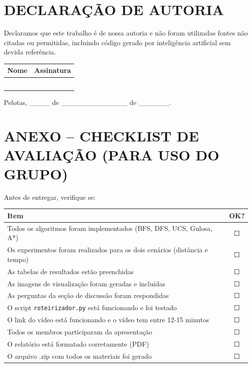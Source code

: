 \documentclass[12pt,a4paper]{article}
\begin{document}
\section{DECLARAÇÃO DE AUTORIA}

Declaramos que este trabalho é de nossa autoria e não foram utilizadas fontes não citadas ou permitidas, incluindo código gerado por inteligência artificial sem devida referência.

\vspace{1cm}

\begin{tabular}{|p{6cm}|p{6cm}|}
\hline
\textbf{Nome} & \textbf{Assinatura} \\
\hline
 &  \\
\hline
 &  \\
\hline
 &  \\
\hline
 &  \\
\hline
 &  \\
\hline
\end{tabular}

\vspace{1cm}

Pelotas, \_\_\_\_ de \_\_\_\_\_\_\_\_\_\_\_\_\_ de \_\_\_\_\_\_.

\newpage

\section*{ANEXO – CHECKLIST DE AVALIAÇÃO (PARA USO DO GRUPO)}

Antes de entregar, verifique se:

\begin{table}[H]
\centering
\begin{tabular}{|p{12cm}|c|}
\hline
\textbf{Item} & \textbf{OK?} \\
\hline
Todos os algoritmos foram implementados (BFS, DFS, UCS, Gulosa, A*) & ☐ \\
\hline
Os experimentos foram realizados para os dois cenários (distância e tempo) & ☐ \\
\hline
As tabelas de resultados estão preenchidas & ☐ \\
\hline
As imagens de visualização foram geradas e incluídas & ☐ \\
\hline
As perguntas da seção de discussão foram respondidas & ☐ \\
\hline
O script \texttt{roteirizador.py} está funcionando e foi testado & ☐ \\
\hline
O link do vídeo está funcionando e o vídeo tem entre 12-15 minutos & ☐ \\
\hline
Todos os membros participaram da apresentação & ☐ \\
\hline
O relatório está formatado corretamente (PDF) & ☐ \\
\hline
O arquivo .zip com todos os materiais foi gerado & ☐ \\
\hline
\end{tabular}
\end{table}
\end{document}
